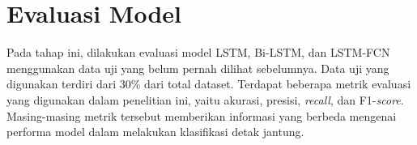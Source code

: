 \section{Evaluasi Model}
Pada tahap ini, dilakukan evaluasi model LSTM, Bi-LSTM, dan LSTM-FCN menggunakan data uji yang belum pernah dilihat sebelumnya.
Data uji yang digunakan terdiri dari 30\% dari total dataset.
Terdapat beberapa metrik evaluasi yang digunakan dalam penelitian ini, yaitu akurasi, presisi, \emph{recall}, dan F1-\emph{score}.
Masing-masing metrik tersebut memberikan informasi yang berbeda mengenai performa model dalam melakukan klasifikasi detak jantung.



